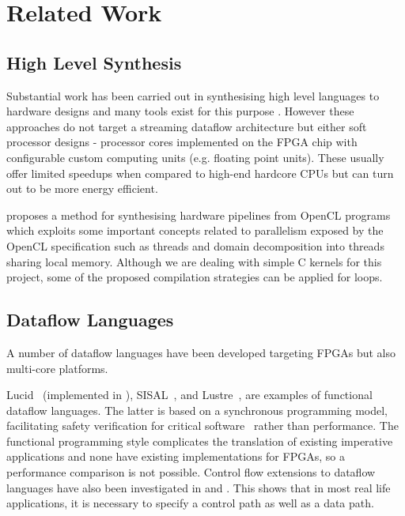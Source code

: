 \section{Related Work}

\subsection{High Level Synthesis}

Substantial work has been carried out in synthesising high level
languages to hardware designs and many tools exist for this purpose
\cite{CtoVerilog, Vivado, ImpulseC}. However these approaches
do not target a streaming dataflow architecture but either soft
processor designs - processor cores implemented on the FPGA chip with
configurable custom computing units (e.g. floating point units). These
usually offer limited speedups when compared to high-end hardcore
CPUs but can turn out to be more energy efficient.

\cite{Czerniawski} proposes a method for synthesising hardware
pipelines from OpenCL programs which exploits some important concepts
related to parallelism exposed by the OpenCL specification
\cite{OpenCL} such as threads and domain decomposition into threads
sharing local memory. Although we are dealing with simple C kernels
for this project, some of the proposed compilation strategies can be
applied for loops.

\subsection{Dataflow Languages}
A number of dataflow languages have been developed targeting FPGAs but
also multi-core platforms.

Lucid~\cite{ashcroft1977lucid} (implemented in \cite{pLucid}),
SISAL~\cite{gurd1987implicit,mcgraw1983sisal}, and
Lustre~\cite{halbwachs1991synchronous}, are examples of functional
dataflow languages. The latter is based on a synchronous programming
model, facilitating safety verification for critical
software~\cite{halbwachs1992programming} rather than performance. The
functional programming style complicates the translation of existing
imperative applications and none have existing implementations for
FPGAs, so a performance comparison is not possible. Control flow
extensions to dataflow languages have also been investigated in
\cite{143862} and \cite{183202}. This shows that in most real life
applications, it is necessary to specify a control path as well as a
data path.

